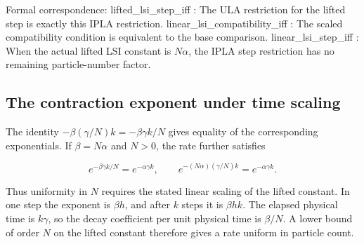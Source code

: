 \documentclass[11pt,a4paper]{report}
\begin{document}
\begin{leanbox}
Formal correspondence: lifted\_lsi\_step\_iff : The ULA restriction for the lifted step is exactly this IPLA restriction. linear\_lsi\_compatibility\_iff : The scaled compatibility condition is equivalent to the base comparison. linear\_lsi\_step\_iff : When the actual lifted LSI constant is \(N\alpha\), the IPLA step restriction has no remaining particle-number factor.
\end{leanbox}
\subsection{\texorpdfstring{The contraction exponent under time scaling}{The contraction exponent under time scaling}}
\label{report-step-IPLA-LSI-Scaling-lean-2}


The identity \(-\beta(\gamma/N)k=-\beta\gamma k/N\) gives equality of the corresponding exponentials. If \(\beta=N\alpha\) and \(N>0\), the rate further satisfies

\[e^{-\beta\gamma k/N}=e^{-\alpha\gamma k},\qquad e^{-(N\alpha)(\gamma/N)k}=e^{-\alpha\gamma k}.\]

Thus uniformity in \(N\) requires the stated linear scaling of the lifted constant. In one step the exponent is \(\beta h\), and after \(k\) steps it is \(\beta hk\). The elapsed physical time is \(k\gamma\), so the decay coefficient per unit physical time is \(\beta/N\). A lower bound of order \(N\) on the lifted constant therefore gives a rate uniform in particle count.
\end{document}
